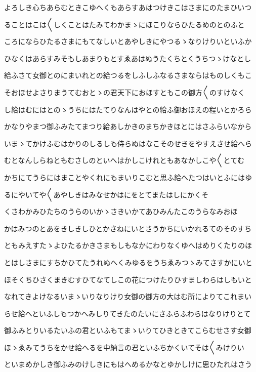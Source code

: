 \documentclass[a4paper,11pt,landscape]{ltjtarticle}
\begin{document}
よろしき心ちあらむときこゆへくもあらすあはつけきこはさまにのたまひいつ
\par\medskip
ることはこは〱しくことはたみてわかまゝにほこりならひたるめのとのふと
\par\medskip
ころにならひたるさまにもてなしいとあやしきにやつるゝなりけりいといふか
\par\medskip
ひなくはあらすみそもしあまりもとすゑあはぬうたくちとくうちつゝけなとし
\par\medskip
給ふさて女御とのにまいれとの給つるをしふしふなるさまならはものしくもこ
\par\medskip
そおほせよさりまうてむおとゝの君天下におほすともこの御方〱のすけなく
\par\medskip
し給はむにはとのゝうちにはたてりなんはやとの給ふ御おほえの程いとかろら
\par\medskip
かなりやまつ御ふみたてまつり給あしかきのまちかきほとにはさふらいなから
\par\medskip
いまゝてかけふむはかりのしるしも侍らぬはなこそのせきをやすえさせ給へら
\par\medskip
むとなんしらねともむさしのといへはかしこけれともあなかしこや〱とてむ
\par\medskip
かちにてうらにはまことやくれにもまいりこむと思ふ給へたつはいとふにはゆ
\par\medskip
るにやいてや〱あやしきはみなせかはにをとてまたはしにかくそ
\par\medskip
くさわかみひたちのうらのいかゝさきいかてあひみんたこのうらなみおほ
\par\medskip
かはみつのとあをきしきしひとかさねにいとさうかちにいかれるてのそのすち
\par\medskip
ともみえすたゝよひたるかきさまもしもなかにわりなくゆへはめりくたりのほ
\par\medskip
とはしさまにすちかひてたうれぬへくみゆるをうちゑみつゝみてさすかにいと
\par\medskip
ほそくちひさくまきむすひてなてしこの花につけたりひすましわらはしもいと
\par\medskip
なれてきよけなるいまゝいりなりけり女御の御方の大はむ所によりてこれまい
\par\medskip
らせ給へといふしもつかへみしりてきたのたいにさふらふわらはなりけりとて
\par\medskip
御ふみとりいるたいふの君といふもてまゝいりてひきときてこらむせさす女御
\par\medskip
ほゝゑみてうちをかせ給へるを中納言の君といふちかくいてそは〱みけりい
\par\medskip
といまめかしき御ふみのけしきにもはへめるかなとゆかしけに思ひたれはさう
\end{document}
